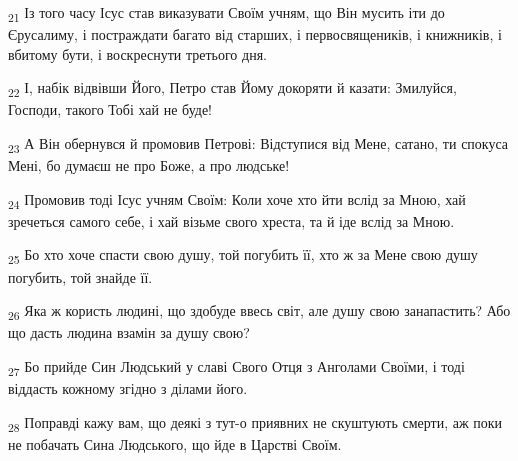\begin{tcolorbox}
\textsubscript{21} Із того часу Ісус став виказувати Своїм учням, що Він мусить іти до Єрусалиму, і постраждати багато від старших, і первосвящеників, і книжників, і вбитому бути, і воскреснути третього дня.
\end{tcolorbox}
\begin{tcolorbox}
\textsubscript{22} І, набік відвівши Його, Петро став Йому докоряти й казати: Змилуйся, Господи, такого Тобі хай не буде!
\end{tcolorbox}
\begin{tcolorbox}
\textsubscript{23} А Він обернувся й промовив Петрові: Відступися від Мене, сатано, ти спокуса Мені, бо думаєш не про Боже, а про людське!
\end{tcolorbox}
\begin{tcolorbox}
\textsubscript{24} Промовив тоді Ісус учням Своїм: Коли хоче хто йти вслід за Мною, хай зречеться самого себе, і хай візьме свого хреста, та й іде вслід за Мною.
\end{tcolorbox}
\begin{tcolorbox}
\textsubscript{25} Бо хто хоче спасти свою душу, той погубить її, хто ж за Мене свою душу погубить, той знайде її.
\end{tcolorbox}
\begin{tcolorbox}
\textsubscript{26} Яка ж користь людині, що здобуде ввесь світ, але душу свою занапастить? Або що дасть людина взамін за душу свою?
\end{tcolorbox}
\begin{tcolorbox}
\textsubscript{27} Бо прийде Син Людський у славі Свого Отця з Анголами Своїми, і тоді віддасть кожному згідно з ділами його.
\end{tcolorbox}
\begin{tcolorbox}
\textsubscript{28} Поправді кажу вам, що деякі з тут-о приявних не скуштують смерти, аж поки не побачать Сина Людського, що йде в Царстві Своїм.
\end{tcolorbox}
